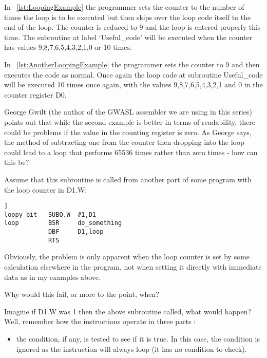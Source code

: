 In \lstlistingname~\ref{lst:LoopingExample} the programmer sets the counter to the number of times
    the loop is to be executed but then skips over the loop code itself to the
    end of the loop. The counter is reduced to 9 and the loop is entered
    properly this time. The subroutine at label `Useful\_code' will be executed
    when the counter has values 9,8,7,6,5,4,3,2,1,0 or 10 times.

In \lstlistingname~\ref{lst:AnotherLoopingExample} the programmer sets the counter to 9 and then executes
    the code as normal. Once again the loop code at subroutine Useful\_code
    will be executed 10 times once again, with the values 9,8,7,6,5,4,3,2,1
    and 0 in the counter register D0.

\begin{note}
George Gwilt (the author of the GWASL assembler we are using in
      this series) points out that while the second example is better in terms
      of readability, there could be problems if the value in the counting
      register is zero. As George says, the method of subtracting one from the
      counter then dropping into the loop could lead to a loop that performs
      65536 times rather than zero times -{} how can this be?

Assume that this subroutine is called from another part of some
      program with the loop counter in D1.W:

\begin{lstlisting}[firstnumber=1,caption={Potentially Bug-{}ridden Looping Example},label={lst:BuggyLoopExample}]]
loopy_bit   SUBQ.W  #1,D1
loop        BSR     do_something
            DBF     D1,loop
            RTS
\end{lstlisting}


Obviously, the problem is only apparent when the loop counter is
      set by some calculation elsewhere in the program, not when setting it
      directly with immediate data as in my examples above.

Why would this fail, or more to the point, when?

Imagine if D1.W was 1 then the above subroutine called, what would
      happen? Well, remember how the  instructions operate in three parts
     :
\begin{itemize}[itemsep=0pt]

\item{}the condition, if any, is tested to see if it is true. In this
          case, the condition is ignored as the  instruction will always
          loop (it has no condition to check).



\end{itemize}
\end{note}
